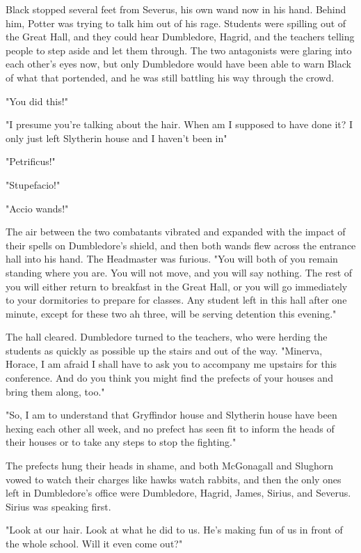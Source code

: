 Black stopped several feet from Severus, his own wand now in his hand. Behind him, Potter was trying to talk him out of his rage. Students were spilling out of the Great Hall, and they could hear Dumbledore, Hagrid, and the teachers telling people to step aside and let them through. The two antagonists were glaring into each other's eyes now, but only Dumbledore would have been able to warn Black of what that portended, and he was still battling his way through the crowd.

"You did this!"

"I presume you're talking about the hair. When am I supposed to have done it? I only just left Slytherin house and I haven't been in{\el}"

"Petrificus!"

"Stupefacio!"

"Accio wands!"

The air between the two combatants vibrated and expanded with the impact of their spells on Dumbledore's shield, and then both wands flew across the entrance hall into his hand. The Headmaster was furious. "You will both of you remain standing where you are. You will not move, and you will say nothing. The rest of you will either return to breakfast in the Great Hall, or you will go immediately to your dormitories to prepare for classes. Any student left in this hall after one minute, except for these two{\el} ah three, will be serving detention this evening."

The hall cleared. Dumbledore turned to the teachers, who were herding the students as quickly as possible up the stairs and out of the way. "Minerva, Horace, I am afraid I shall have to ask you to accompany me upstairs for this conference. And do you think you might find the prefects of your houses and bring them along, too."

"So, I am to understand that Gryffindor house and Slytherin house have been hexing each other all week, and no prefect has seen fit to inform the heads of their houses or to take any steps to stop the fighting."

The prefects hung their heads in shame, and both McGonagall and Slughorn vowed to watch their charges like hawks watch rabbits, and then the only ones left in Dumbledore's office were Dumbledore, Hagrid, James, Sirius, and Severus. Sirius was speaking first.

"Look at our hair. Look at what he did to us. He's making fun of us in front of the whole school. Will it even come out?"


